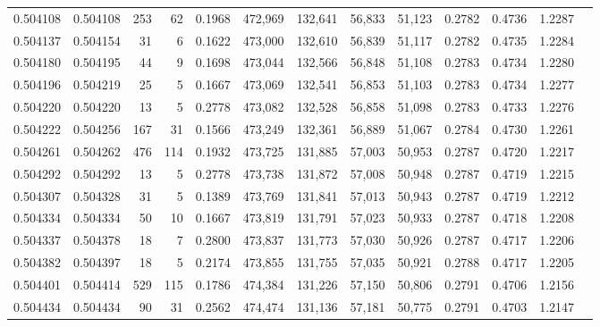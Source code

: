 \begin{tabular}{rrrrrrrrrrrrr}
0.504108 & 0.504108 &   253 &    62 &                                     0.1968 & 472,969 & 132,641 &  56,833 &  51,123 & 0.2782 & 0.4736 & 1.2287 \\
0.504137 & 0.504154 &    31 &     6 &                                     0.1622 & 473,000 & 132,610 &  56,839 &  51,117 & 0.2782 & 0.4735 & 1.2284 \\
0.504180 & 0.504195 &    44 &     9 &                                     0.1698 & 473,044 & 132,566 &  56,848 &  51,108 & 0.2783 & 0.4734 & 1.2280 \\
0.504196 & 0.504219 &    25 &     5 &                                     0.1667 & 473,069 & 132,541 &  56,853 &  51,103 & 0.2783 & 0.4734 & 1.2277 \\
0.504220 & 0.504220 &    13 &     5 &                                     0.2778 & 473,082 & 132,528 &  56,858 &  51,098 & 0.2783 & 0.4733 & 1.2276 \\
0.504222 & 0.504256 &   167 &    31 &                                     0.1566 & 473,249 & 132,361 &  56,889 &  51,067 & 0.2784 & 0.4730 & 1.2261 \\
0.504261 & 0.504262 &   476 &   114 &                                     0.1932 & 473,725 & 131,885 &  57,003 &  50,953 & 0.2787 & 0.4720 & 1.2217 \\
0.504292 & 0.504292 &    13 &     5 &                                     0.2778 & 473,738 & 131,872 &  57,008 &  50,948 & 0.2787 & 0.4719 & 1.2215 \\
0.504307 & 0.504328 &    31 &     5 &                                     0.1389 & 473,769 & 131,841 &  57,013 &  50,943 & 0.2787 & 0.4719 & 1.2212 \\
0.504334 & 0.504334 &    50 &    10 &                                     0.1667 & 473,819 & 131,791 &  57,023 &  50,933 & 0.2787 & 0.4718 & 1.2208 \\
0.504337 & 0.504378 &    18 &     7 &                                     0.2800 & 473,837 & 131,773 &  57,030 &  50,926 & 0.2787 & 0.4717 & 1.2206 \\
0.504382 & 0.504397 &    18 &     5 &                                     0.2174 & 473,855 & 131,755 &  57,035 &  50,921 & 0.2788 & 0.4717 & 1.2205 \\
0.504401 & 0.504414 &   529 &   115 &                                     0.1786 & 474,384 & 131,226 &  57,150 &  50,806 & 0.2791 & 0.4706 & 1.2156 \\
0.504434 & 0.504434 &    90 &    31 &                                     0.2562 & 474,474 & 131,136 &  57,181 &  50,775 & 0.2791 & 0.4703 & 1.2147 \\

\end{tabular}

